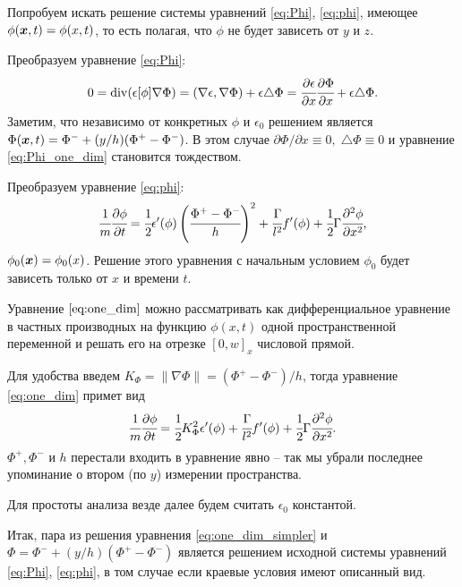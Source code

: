 Попробуем искать решение системы уравнений \eqref{eq:Phi}, \eqref{eq:phi}, имеющее $\phi({\boldsymbol{x}}, t) = \phi(x, t)$, то есть полагая, что $\phi$ не будет зависеть от $y$ и $z$.

Преобразуем уравнение \eqref{eq:Phi}:
\begin{equation}
    0 = \operatorname{div}(\epsilon[\phi] \nabla \Phi) = (\nabla \epsilon, \nabla \Phi) + \epsilon \triangle \Phi = \cfrac{\partial \epsilon}{\partial x} \cfrac{\partial \Phi}{\partial x} + \epsilon \triangle \Phi {\text{.}}
    \label{eq:Phi_one_dim}
\end{equation}
Заметим, что независимо от конкретных $\phi$ и $\epsilon_0$ решением является $\Phi({\boldsymbol{x}}, t) = \Phi^- + (y/h)(\Phi^+ - \Phi^-)$. В этом случае $\partial \Phi / \partial x \equiv 0, \; \triangle \Phi \equiv 0$ и уравнение \eqref{eq:Phi_one_dim} становится тождеством.

Преобразуем уравнение \eqref{eq:phi}:
\begin{equation}
    \cfrac{1}{m} \cfrac{\partial \phi}{\partial t} = \cfrac{1}{2} \epsilon'(\phi) \left( \cfrac{\Phi^+ - \Phi^-}{h} \right)^2 + \cfrac{\Gamma}{l^2} f'(\phi) + \cfrac{1}{2} \Gamma \cfrac{\partial^2 \phi}{\partial x^2} {\text{,}}
    \label{eq:one_dim}
\end{equation}
$\phi_0({\boldsymbol{x}}) = \phi_0(x)$. Решение этого уравнения с начальным условием $\phi_0$ будет зависеть только от $x$ и времени $t$.

Уравнение $\eqref{eq:one_dim}$ можно рассматривать как дифференциальное уравнение в частных производных на функцию $\phi(x, t)$ одной пространственной переменной и решать его на отрезке $[0, w]_x$ числовой прямой.

Для удобства введем $K_\Phi = \|\nabla \Phi\| = (\Phi^+ - \Phi^-)/h$, тогда уравнение \eqref{eq:one_dim} примет вид
\begin{equation}
    \cfrac{1}{m} \cfrac{\partial \phi}{\partial t} = \cfrac{1}{2} K_\Phi^2 \epsilon'(\phi) + \cfrac{\Gamma}{l^2} f'(\phi) + \cfrac{1}{2} \Gamma \cfrac{\partial^2 \phi}{\partial x^2} {\text{.}}
    \label{eq:one_dim_simpler}
\end{equation}
$\Phi^+, \Phi^-$ и $h$ перестали входить в уравнение явно -- так мы убрали последнее упоминание о втором (по $y$) измерении пространства.

Для простоты анализа везде далее будем считать $\epsilon_0$ константой.

Итак, пара из решения уравнения \eqref{eq:one_dim_simpler} и $\Phi = \Phi^- + (y/h)(\Phi^+ - \Phi^-)$ является решением исходной системы уравнений \eqref{eq:Phi}, \eqref{eq:phi}, в том случае если краевые условия имеют описанный вид.